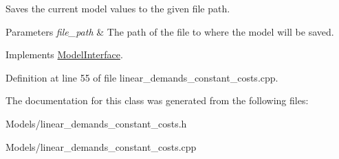 Saves the current model values to the given file path.


\begin{DoxyParams}{Parameters}
{\em file\+\_\+path} & The path of the file to where the model will be saved. \\
\hline
\end{DoxyParams}


Implements \hyperlink{classModelInterface_ab5709db8ecb96fd9efd02f4777d5502a}{Model\+Interface}.



Definition at line 55 of file linear\+\_\+demands\+\_\+constant\+\_\+costs.\+cpp.



The documentation for this class was generated from the following files\+:\begin{DoxyCompactItemize}
\item 
Models/linear\+\_\+demands\+\_\+constant\+\_\+costs.\+h\item 
Models/linear\+\_\+demands\+\_\+constant\+\_\+costs.\+cpp\end{DoxyCompactItemize}
